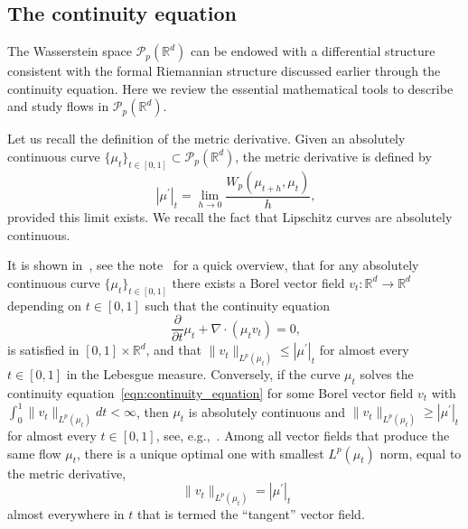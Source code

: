\documentclass[12pt]{amsart}
\begin{document}
\subsection{The continuity equation}

The Wasserstein space $\mathcal{P}_p(\mathbb{R}^d)$ can be endowed with a differential structure consistent with the formal Riemannian structure discussed earlier through the continuity equation. Here we review the essential mathematical tools to describe and study flows in $\mathcal{P}_p(\mathbb{R}^d)$.

Let us recall the definition of the metric derivative. Given an absolutely continuous curve $\{\mu_t\}_{t\in[0, 1]} \subset \mathcal{P}_p(\mathbb{R}^d)$, the metric derivative is defined by
\begin{equation}~\label{eqn:metric_derivative}
    |\mu^\prime|_t = \lim_{h\rightarrow 0}\frac{W_p(\mu_{t+h}, \mu_t)}{h},
\end{equation}
provided this limit exists. We recall the fact that Lipschitz curves are absolutely continuous.

It is shown in~\cite{ambrosio2008gradient}, see the note~\cite{santambrogio2010introduction} for a quick overview, that for any absolutely continuous curve $\{\mu_t\}_{t\in[0, 1]}$ there exists a Borel vector field $v_t:\mathbb{R}^d\rightarrow\mathbb{R}^d$ depending on $t\in[0,1]$ such that the continuity equation
\begin{equation}~\label{eqn:continuity_equation}
    \frac{\partial}{\partial t} \mu_t + \nabla \cdot (\mu_t v_t) = 0,
\end{equation}
is satisfied in $[0,1]\times\mathbb{R}^d$, and that $\|v_t\|_{L^p(\mu_t)}\leq |\mu^\prime|_t$ for almost every $t\in[0, 1]$ in the Lebesgue measure. Conversely, if the curve $\mu_t$ solves the continuity equation~\eqref{eqn:continuity_equation} for some Borel vector field $v_t$ with $\int_0^1\|v_t\|_{L^p(\mu_t)}dt<\infty$, then $\mu_t$ is absolutely continuous and $\|v_t\|_{L^p(\mu_t)}\geq |\mu^\prime|_t$ for almost every $t\in[0,1]$, see, e.g.,~\cite[Theorem~5.14]{santambrogio2015optimal}. Among all vector fields that produce the same flow $\mu_t$, there is a unique optimal one with smallest $L^p(\mu_t)$ norm, equal to the metric derivative,
\begin{equation}~\label{eqn:metric_velocity_equality}
    \|v_t\|_{L^p(\mu_t)}=|\mu^\prime|_t
\end{equation}
almost everywhere in $t$ that is termed the ``tangent'' vector field.
\end{document}

